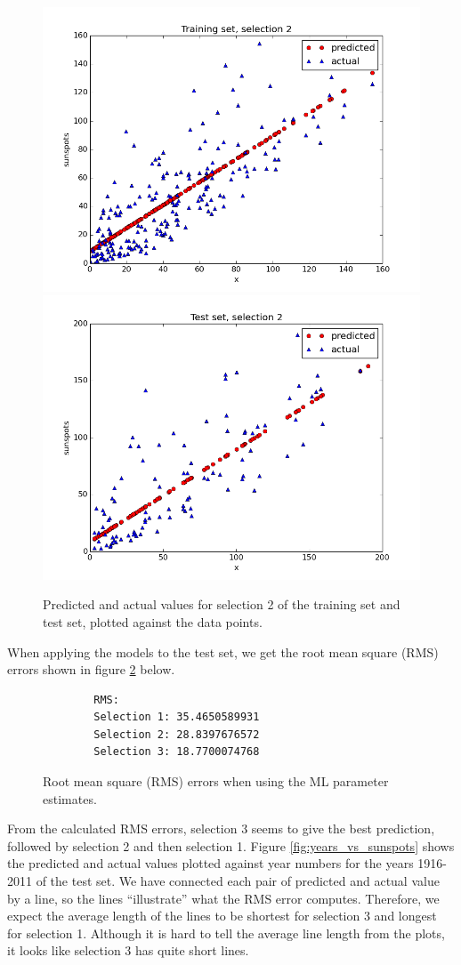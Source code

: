\documentclass[a4paper]{article}
\begin{document}
\begin{figure}[H]
  \begin{adjustwidth}{-7em}{-7em}
    \centering
    \includegraphics[width=.47\linewidth]{figures/training_set_selection2.png}
    \includegraphics[width=.47\linewidth]{figures/test_set_selection2.png}
  \end{adjustwidth}
  \caption{Predicted and actual values for selection 2 of the training set and test set, plotted against the data points.}
  \label{fig:selection2}
\end{figure}

When applying the models to the test set, we get the root mean square (RMS) errors shown in figure \ref{fig:rms_ml} below.

\begin{figure}[H]
	\begin{lstlisting}
        RMS:
        Selection 1: 35.4650589931
        Selection 2: 28.8397676572
        Selection 3: 18.7700074768
	\end{lstlisting}
	\caption{Root mean square (RMS) errors when using the ML parameter estimates.}
	\label{fig:rms_ml}
\end{figure}

From the calculated RMS errors, selection 3 seems to give the best prediction, followed by selection 2 and then selection 1. Figure \ref{fig:years_vs_sunspots} shows the predicted and actual values plotted against year numbers for the years 1916-2011 of the test set. We have connected each pair of predicted and actual value by a line, so the lines ``illustrate'' what the RMS error computes. Therefore, we expect the average length of the lines to be shortest for selection 3 and longest for selection 1. Although it is hard to tell the average line length from the plots, it looks like selection 3 has quite short lines.
\end{document}
